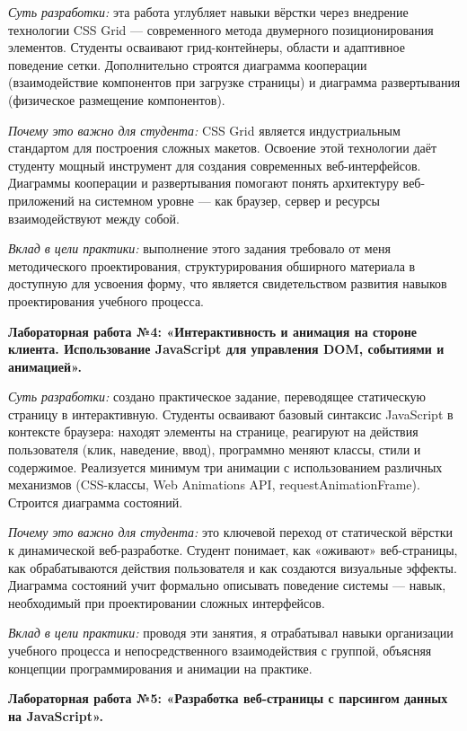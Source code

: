 \textit{Суть разработки:} эта работа углубляет навыки вёрстки через внедрение технологии CSS Grid — современного метода двумерного позиционирования элементов. Студенты осваивают грид-контейнеры, области и адаптивное поведение сетки. Дополнительно строятся диаграмма кооперации (взаимодействие компонентов при загрузке страницы) и диаграмма развертывания (физическое размещение компонентов).

\textit{Почему это важно для студента:} CSS Grid является индустриальным стандартом для построения сложных макетов. Освоение этой технологии даёт студенту мощный инструмент для создания современных веб-интерфейсов. Диаграммы кооперации и развертывания помогают понять архитектуру веб-приложений на системном уровне — как браузер, сервер и ресурсы взаимодействуют между собой.

\textit{Вклад в цели практики:} выполнение этого задания требовало от меня методического проектирования, структурирования обширного материала в доступную для усвоения форму, что является свидетельством развития навыков проектирования учебного процесса.

\vspace{1em}
\textbf{Лабораторная работа №4: «Интерактивность и анимация на стороне клиента. Использование JavaScript для управления DOM, событиями и анимацией».}

\textit{Суть разработки:} создано практическое задание, переводящее статическую страницу в интерактивную. Студенты осваивают базовый синтаксис JavaScript в контексте браузера: находят элементы на странице, реагируют на действия пользователя (клик, наведение, ввод), программно меняют классы, стили и содержимое. Реализуется минимум три анимации с использованием различных механизмов (CSS-классы, Web Animations API, requestAnimationFrame). Строится диаграмма состояний.

\textit{Почему это важно для студента:} это ключевой переход от статической вёрстки к динамической веб-разработке. Студент понимает, как «оживают» веб-страницы, как обрабатываются действия пользователя и как создаются визуальные эффекты. Диаграмма состояний учит формально описывать поведение системы — навык, необходимый при проектировании сложных интерфейсов.

\textit{Вклад в цели практики:} проводя эти занятия, я отрабатывал навыки организации учебного процесса и непосредственного взаимодействия с группой, объясняя концепции программирования и анимации на практике.

\vspace{1em}
\textbf{Лабораторная работа №5: «Разработка веб-страницы с парсингом данных на JavaScript».}

